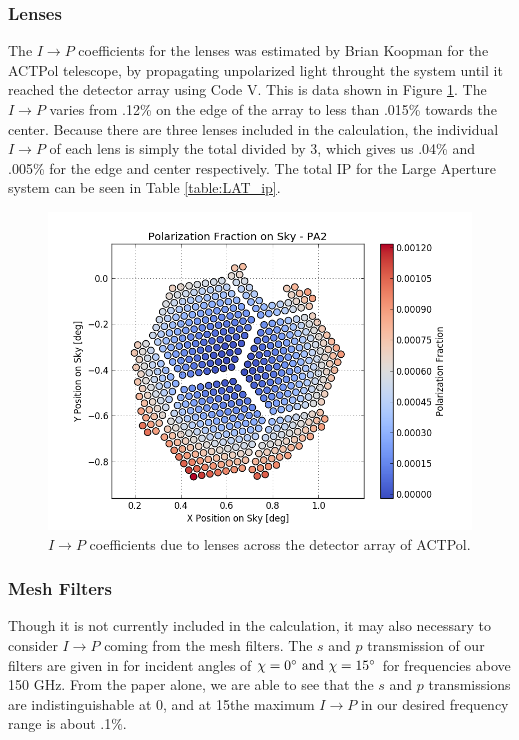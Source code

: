 \documentclass{article}
\theoremstyle{remark}
\newcommand{\tab}{\hspace*{2em}}
\renewcommand{\t}[1]{\text{#1}}
\newcommand{\ip}{$I\rightarrow P$ }
\begin{document}
\subsubsection{Lenses}
\tab The $I\rightarrow P$ coefficients for the lenses was estimated by Brian Koopman for the ACTPol telescope, by propagating unpolarized light throught the system until it reached the detector array using Code V. 
This is data shown in Figure \ref{fig:IP-array}. 
The \ip varies from .12\% on the edge of the array to less than .015\% towards the center.
Because there are three lenses included in the calculation, the individual \ip of each lens is simply the total divided by 3, which gives us .04\% and .005\% for the edge and center respectively.
The total IP for the Large Aperture system can be seen in Table \ref{table:LAT_ip}.
\begin{figure}[t!]
	\centering
  \includegraphics[width=.8\linewidth]{images/pa2_polarization_fraction.png}
  \caption{$I\rightarrow P$ coefficients due to lenses across the detector array of ACTPol.}
  \label{fig:IP-array}
\end{figure}

\subsubsection{Mesh Filters}
\tab Though it is not currently included in the calculation, it may also necessary to consider \ip coming from the mesh filters. 
The $s$ and $p$ transmission of our filters are given in \cite{pisano_polarisation_2006} for incident angles of 
$\chi = 0\degree \t{ and } \chi = 15\degree$ for frequencies above 150 GHz.
From the paper alone, we are able to see that the $s$ and $p$ transmissions are indistinguishable at 0\degree, 
and at 15\degree the maximum \ip in our desired frequency range is about .1\%.
\end{document}
